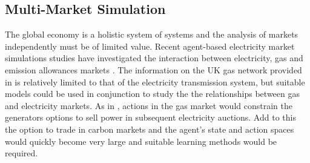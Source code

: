 \subsection{Multi-Market Simulation}
The global economy is a holistic system of
systems and the analysis of markets independently must be of limited value.
Recent agent-based electricity market simulations studies have investigated the
interaction between electricity, gas and emission allowances markets
\cite{krause:gas,wang:09}.
The information on the UK gas network provided in  is
relatively limited to that of the electricity transmission system, but
suitable models could be used in conjunction to study the the relationships
between gas and electricity markets.  As in , actions in the
gas market would constrain the generators options to sell power in subsequent
electricity auctions.  Add to this the option to trade in carbon markets and
the agent's state and action spaces would quickly become very large and
suitable learning methods would be required.

%
%

